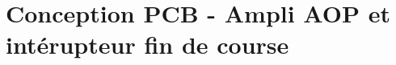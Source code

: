 \documentclass[french,a4paper,12pt]{report}
\begin{document}
	\section{Conception PCB - Ampli AOP et intérupteur fin de course}
%		
%			
%		
%		
%		
%			
%				
		
%		
%			
%		
%		
%		
%			
\end{document}
